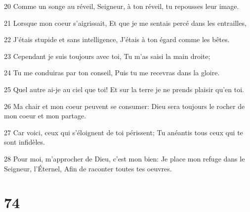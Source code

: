\par 20 Comme un songe au réveil, Seigneur, à ton réveil, tu repousses leur image.
\par 21 Lorsque mon coeur s'aigrissait, Et que je me sentais percé dans les entrailles,
\par 22 J'étais stupide et sans intelligence, J'étais à ton égard comme les bêtes.
\par 23 Cependant je suis toujours avec toi, Tu m'as saisi la main droite;
\par 24 Tu me conduiras par ton conseil, Puis tu me recevras dans la gloire.
\par 25 Quel autre ai-je au ciel que toi! Et sur la terre je ne prends plaisir qu'en toi.
\par 26 Ma chair et mon coeur peuvent se consumer: Dieu sera toujours le rocher de mon coeur et mon partage.
\par 27 Car voici, ceux qui s'éloignent de toi périssent; Tu anéantis tous ceux qui te sont infidèles.
\par 28 Pour moi, m'approcher de Dieu, c'est mon bien: Je place mon refuge dans le Seigneur, l'Éternel, Afin de raconter toutes tes oeuvres.

\chapter{74}

